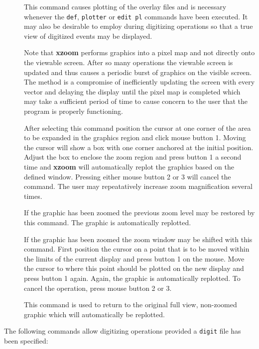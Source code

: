 \begin{description}
\item[]
This command causes plotting of the overlay files and is necessary
whenever the {\tt def}, {\tt plotter} or {\tt edit pl} commands have
been executed.
It may also be desirable to employ during digitizing operations
so that a true view of digitized events may be displayed.

Note that {\bf xzoom} performs graphics into a pixel map and
not directly onto the viewable screen.
After so many operations the viewable screen is updated and
thus causes a periodic burst of graphics on the visible screen.
The method is a compromise of inefficiently updating the screen
with every vector and delaying the display until the pixel map
is completed which may take a sufficient period of time to cause
concern to the user that the program is properly functioning.
\item[]
After selecting this command position the cursor at one corner
of the area to be expanded in the graphics region and click
mouse button 1.
Moving the cursor will show a box with one corner
anchored at the initial position.
Adjust the box to enclose the zoom region and press button
1 a second time and
{\bf xzoom} will automatically replot the graphics based on the
defined window.
Pressing either mouse button 2 or 3 will cancel the command.
The user may repeatatively increase zoom magnification several times.
\item[]
If the graphic has been zoomed the previous zoom level may
be restored by this command.
The graphic is automatically replotted.
\item[]
If the graphic has been zoomed the zoom window may be shifted
with this command.
First position the cursor on a point that is to be moved within
the limits of the current display and press button 1 on the mouse.
Move the cursor to where this point should be plotted on the
new display and press button 1 again.
Again, the graphic is automatically replotted.
To cancel the operation, press mouse button 2 or 3.
\item[]
This command is used
to return to the original full view, non-zoomed graphic which
will automatically be replotted.
\end{description}
The following commands allow digitizing operations provided
a {\tt digit} file has been specified:
